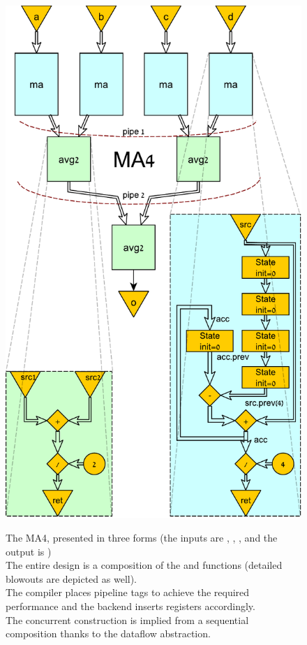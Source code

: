 \begin{figure}[t!]
\begin{minipage}[b][10.8cm][t]{0.34\linewidth}
  	\includegraphics[width=0.884\linewidth]{graphics/ma.pdf}
  	\captionsetup{justification=centering}
		\label{fig:MADraw}
  \end{minipage}%
  \captionsetup{justification=centering}      
  \caption{
		The MA4, presented in three forms (the inputs are , , ,  and the output is ) \\ 
		The entire design is a composition of the  and  functions (detailed blowouts are depicted as well). \\ 
		The compiler places pipeline tags to achieve the required performance and the backend inserts registers accordingly. \\
		The concurrent construction is implied from a sequential composition thanks to the dataflow abstraction. 
	}
\end{figure}

